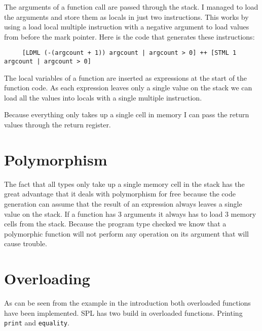 \documentclass{report}
\begin{document}
The arguments of a function call are passed through the stack. I managed to load the arguments and store them as locals in just two instructions. This works by using a load local multiple instruction with a negative argument to load values from before the mark pointer. Here is the code that generates these instructions:

\begin{verbatim}
     [LDML (-(argcount + 1)) argcount | argcount > 0] ++ [STML 1 argcount | argcount > 0]
\end{verbatim}

The local variables of a function are inserted as expressions at the start of the function code. As each expression leaves only a single value on the stack we can load all the values into locals with a single multiple instruction. 

\noindent Because everything only takes up a single cell in memory I can pass the return values through the return register. 





\section{Polymorphism}

The fact that all types only take up a single memory cell in the stack has the great advantage that it deals with polymorphism for free because the code generation can assume that the result of an expression always leaves a single value on the stack. If a function has 3 arguments it always has to load 3 memory cells from the stack. Because the program type checked we know that a polymorphic function will not perform any operation on its argument that will cause trouble. 


\section{Overloading}

As can be seen from the example in the introduction both overloaded functions have been implemented.
SPL has two build in overloaded functions. Printing \texttt{print} and \texttt{equality}.
\end{document}
